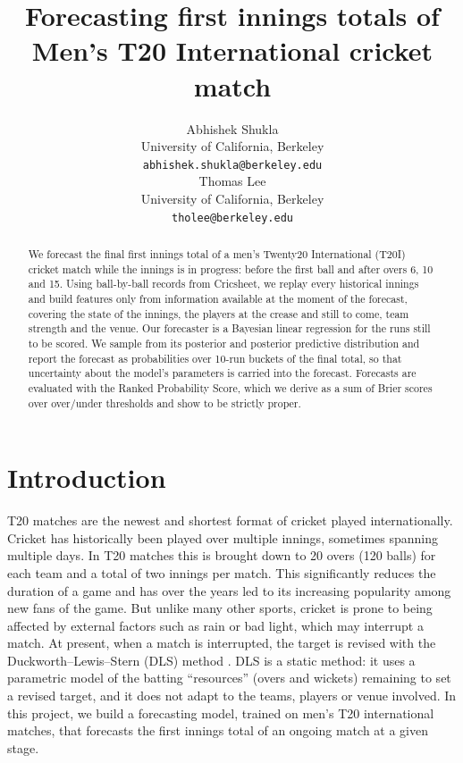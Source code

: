 \documentclass{article}
\title{Forecasting first innings totals of Men's T20 International cricket match}
\author{
{\hspace{1mm}Abhishek Shukla} \\
	University of California, Berkeley\\
	\texttt{abhishek.shukla@berkeley.edu} \\
	\And
	{\hspace{1mm}Thomas Lee} \\
	University of California, Berkeley\\
	\texttt{tholee@berkeley.edu} \\
}
\newcommand{\1}{\mathbf{1}}
\begin{document}
\maketitle

\begin{abstract}
We forecast the final first innings total of a men's Twenty20 International (T20I) cricket match while the innings is in progress: before the first ball and after overs 6, 10 and 15. Using ball-by-ball records from Cricsheet, we replay every historical innings and build features only from information available at the moment of the forecast, covering the state of the innings, the players at the crease and still to come, team strength and the venue. Our forecaster is a Bayesian linear regression for the runs still to be scored. We sample from its posterior and posterior predictive distribution and report the forecast as probabilities over 10-run buckets of the final total, so that uncertainty about the model's parameters is carried into the forecast. Forecasts are evaluated with the Ranked Probability Score, which we derive as a sum of Brier scores over over/under thresholds and show to be strictly proper.
\end{abstract}




\section{Introduction}
T20 matches are the newest and shortest format of cricket played internationally. Cricket has historically been played over multiple innings, sometimes spanning multiple days. In T20 matches this is brought down to 20 overs (120 balls) for each team and a total of two innings per match. This significantly reduces the duration of a game and has over the years led to its increasing popularity among new fans of the game. But unlike many other sports, cricket is prone to being affected by external factors such as rain or bad light, which may interrupt a match. At present, when a match is interrupted, the target is revised with the Duckworth--Lewis--Stern (DLS) method \citep{duckworth1998,stern2016}. DLS is a static method: it uses a parametric model of the batting ``resources'' (overs and wickets) remaining to set a revised target, and it does not adapt to the teams, players or venue involved. In this project, we build a forecasting model, trained on men's T20 international matches, that forecasts the first innings total of an ongoing match at a given stage.
\end{document}
